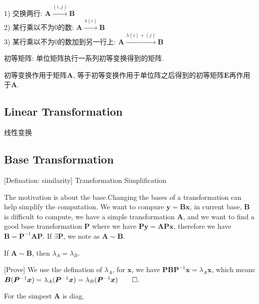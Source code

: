 \documentclass[UTF8]{../../09-Mathematics}
\begin{document}
1) 交换两行: $ \boldsymbol A \xrightarrow {(i,j)} \boldsymbol B$ \\

2) 某行乘以不为0的数: $ \boldsymbol A \xrightarrow {\lambda(i)} \boldsymbol B$ \\

3) 某行乘以不为0的数加到另一行上: $ \boldsymbol A \xrightarrow {\lambda(i) + (j)} \boldsymbol B$

初等矩阵: 单位矩阵执行一系列初等变换得到的矩阵. 

初等变换作用于矩阵$\boldsymbol A$, 等于初等变换作用于单位阵之后得到的初等矩阵$\boldsymbol E$再作用于$\boldsymbol A$. 


\subsection{Linear Transformation}
线性变换



\subsection{Base Transformation}

[Defination: similarity] Transformation Simplification

The motivation is about the base.Changing the bases of a transformation can help simplify the computation. We want to compure $\boldsymbol y = \boldsymbol B \boldsymbol x$, in current base, $\boldsymbol B$ is difficult to compute, we have a simple transformation $\boldsymbol A$, and we want to find a good base transformation $\boldsymbol P$ where we have $\boldsymbol P \boldsymbol y = \boldsymbol A  \boldsymbol P \boldsymbol x $, therefore we have $\boldsymbol B  = \boldsymbol P ^{-1}\boldsymbol A  \boldsymbol P  $. If $ \exists \boldsymbol P$, we  note as $\boldsymbol A \sim \boldsymbol B$.


\begin{lemma}
    If $\boldsymbol A \sim \boldsymbol B$, then $\lambda_A = \lambda_B$.

[Prove] 
We use the defination of $\lambda_A $, for $\boldsymbol x$, we have $\boldsymbol P\boldsymbol B \boldsymbol P ^{-1} \boldsymbol x = \lambda_A \boldsymbol x$, which means $\boldsymbol B  (\boldsymbol P ^{-1} \boldsymbol x) = \lambda_A (\boldsymbol P ^{-1} \boldsymbol x)= \lambda_B (\boldsymbol P ^{-1} \boldsymbol x) \qed$.
\end{lemma}

For the simpest $\boldsymbol A$ is diag.
\end{document}
